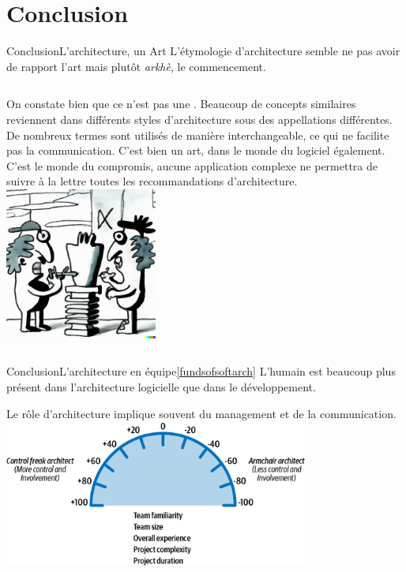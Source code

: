 \documentclass{beamer}
\begin{document}
    \section{Conclusion}\label{sec:conclusion}

    \begin{frame}{Conclusion}{L'architecture, un Art}
        L'étymologie d'architecture semble ne pas avoir de rapport l'art mais plutôt \textit{arkhè}, le commencement.
        \begin{columns}
            \bigbreak
            On constate bien que ce n'est pas une .
            Beaucoup de concepts similaires reviennent dans différents styles d'architecture sous des appellations différentes.
            De nombreux termes sont utilisés de manière interchangeable, ce qui ne facilite pas la communication.
            C'est bien un art, dans le monde du logiciel également.
            \bigbreak
            C'est le monde du compromis, aucune application complexe ne permettra de suivre à la lettre toutes les recommandations d'architecture.
            \centering
            \includegraphics[width=5cm]{image/two-artists-arguing}
        \end{columns}
    \end{frame}

    \begin{frame}{Conclusion}{L'architecture en équipe\cref{fundsofsoftarch}}
        L'humain est beaucoup plus présent dans l'architecture logicielle que dans le développement.

        Le rôle d'architecture implique souvent du management et de la communication.
        \bigbreak
        \centering
        \includegraphics[width=10cm]{image/efficient-team}
    \end{frame}
\end{document}
